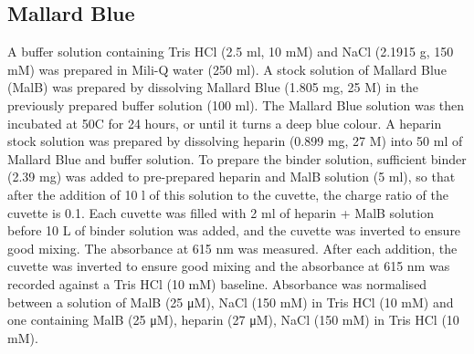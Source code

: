 \subsection*{Mallard Blue}
A buffer solution containing Tris HCl (2.5 ml, 10 mM) and NaCl (2.1915 g, 150 mM) was prepared in Mili-Q water  (250 ml).
\newline
A stock solution of Mallard Blue (MalB) was prepared by dissolving Mallard Blue (1.805 mg, 25 \textmu M) in the previously prepared buffer solution (100 ml). The Mallard Blue solution was then incubated at 50\textdegree C for 24 hours, or until it turns a deep blue colour.
\newline
A heparin stock solution was prepared  by dissolving heparin (0.899 mg, 27 \textmu M) into 50 ml of Mallard Blue and buffer solution. 
\newline
To prepare the binder solution, sufficient binder (2.39 mg) was added to pre-prepared heparin and MalB solution (5 ml), so that after the addition of 10 \textmu l of this solution to the cuvette, the charge ratio of the cuvette is 0.1.
\newline
Each cuvette was filled with 2 ml of heparin + MalB solution before 10 \textmu L of binder solution was added, and the cuvette was inverted to ensure good mixing. The absorbance at 615 nm was measured. 
After each addition, the cuvette was inverted to ensure good mixing and the
absorbance at 615 nm was recorded against a Tris HCl (10 mM) baseline. Absorbance
was normalised between a solution of MalB (25 μM), NaCl (150 mM) in Tris HCl (10
mM) and one containing MalB (25 μM), heparin (27 μM), NaCl (150 mM) in Tris HCl
(10 mM).
